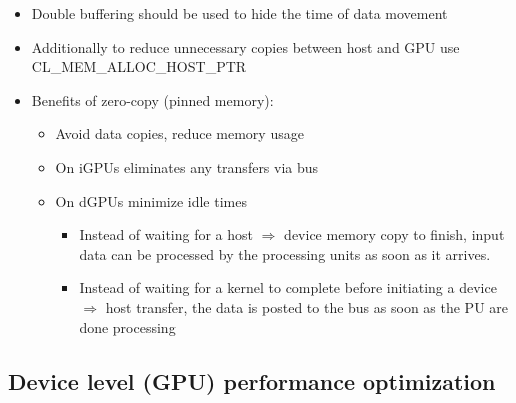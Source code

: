 \documentclass[paper=a4, fontsize=11pt]{scrartcl} %
\numberwithin{equation}{section} %
\numberwithin{figure}{section} %
\numberwithin{table}{section} %
\begin{document}
\begin{itemize}
\begin{itemize}
    \item Double buffering should be used to hide the time of data movement
    \item Additionally to reduce unnecessary copies between host and GPU use CL_MEM_ALLOC_HOST_PTR
    \item Benefits of zero-copy (pinned memory):
    \begin{itemize}
      \item Avoid data copies, reduce memory usage
      \item On iGPUs eliminates any transfers via bus
      \item On dGPUs minimize idle times
      \begin{itemize}
        \item Instead of waiting for a host $\Rightarrow$ device memory copy to finish, input data can be processed by the processing units as soon as it arrives.
        \item Instead of waiting for a kernel to complete before initiating a device $\Rightarrow$ host transfer, the data is posted to the bus as soon as the PU are done processing
      \end{itemize}
    \end{itemize}
  \end{itemize}
\end{itemize}

\subsection{Device level (GPU) performance optimization}
\end{document}
